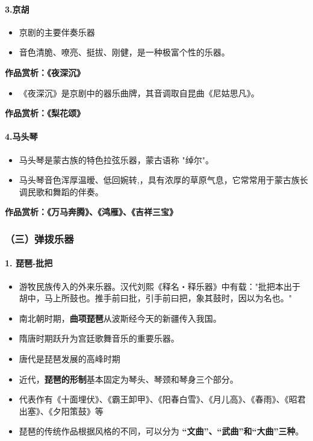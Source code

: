 \documentclass[
]{article}
\providecommand{\tightlist}{%
  \setlength{\itemsep}{0pt}\setlength{\parskip}{0pt}}
\begin{document}
\paragraph{3.京胡}\label{ux4eacux80e1}

\begin{itemize}
\tightlist
\item
  京剧的主要伴奏乐器
\item
  音色清脆、嘹亮、挺拔、刚健，是一种极富个性的乐器。
\end{itemize}

\textbf{作品赏析：《夜深沉》}

\begin{itemize}
\tightlist
\item
  《夜深沉》是京剧中的器乐曲牌，其音调取自昆曲《尼姑思凡》。
\end{itemize}

\textbf{作品赏析：《梨花颂》}

\paragraph{4.马头琴}\label{ux9a6cux5934ux7434}

\begin{itemize}
\tightlist
\item
  马头琴是蒙古族的特色拉弦乐器，蒙古语称 "绰尔"。
\item
  马头琴音色浑厚温暧、低回婉转,，具有浓厚的草原气息，它常常用于蒙古族长调民歌和舞蹈的伴奏。
\end{itemize}

\textbf{作品赏析：《万马奔腾》、《鸿雁》、《吉祥三宝》}

\subsubsection{（三）弹拨乐器}\label{ux4e09ux5f39ux62e8ux4e50ux5668}

\paragraph{1. 琵琶-批把}\label{ux7435ux7436-ux6279ux628a}

\begin{itemize}
\tightlist
\item
  游牧民族传入的外来乐器。汉代刘熙《释名・释乐器》中有载："批把本出于胡中，马上所鼓也。推手前曰批，引手前曰把，象其鼓时，因以为名也。"
\item
  南北朝时期，\textbf{曲项琵琶}从波斯经今天的新疆传入我国。
\item
  隋唐时期跃升为宫廷歌舞音乐的重要乐器。
\item
  唐代是琵琶发展的高峰时期
\item
  近代，\textbf{琵琶的形制}基本固定为琴头、琴颈和琴身三个部分。
\item
  代表作有《十面埋伏》、《霸王卸甲》、《阳春白雪》、《月儿高》、《春雨》、《昭君出塞》、《夕阳策鼓》等
\item
  琵琶的传统作品根据风格的不同，可以分为
  \textbf{``文曲''、``武曲''和``大曲''三种}。
\end{itemize}
\end{document}
